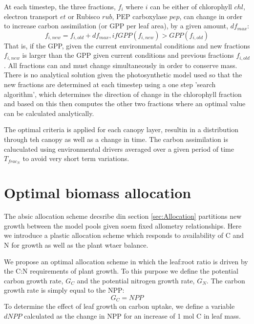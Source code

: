 At each timestep, the three fractions, $f_i$ where $i$ can be either of chlorophyll $chl$, electron transport $et$ or Rubisco $rub$, PEP carboxylase $pep$, can change in order to increase carbon assimilation (or GPP per leaf area), by a given amount, $df_{max}$:
\begin{equation}
 f_{i, new}=f_{i, old}+df_{max}, if GPP(f_{i, new})>GPP(f_{i, old})
\end{equation}
That is, if the GPP, given the current environmental conditions and new fractions $f_{i, new}$ is larger than the GPP given current conditions and previous fractions $f_{i, old}$. All fractions can and must change simultaneously in order to conserve mass. There is no analytical solution given the photosynthetic model used so that the new fractions are determined at each timestep using a one step 'search algorithm', which determines the direction of change in the chlorophyll fraction and based on this then computes the other two fractions where an optimal value can be calculated analytically.

The optimal criteria is applied for each canopy layer, resultin in a distribution through teh canopy as well as a change in time. The carbon assimilation is caluculated using environmental drivers averaged over a given period of time $T_{frac_N}$ to avoid very short term variations.

\section{Optimal biomass allocation}\label{sec:optimal_allocation}
The absic allocation scheme decsribe din section \ref{sec:Allocation} partitions new growth between the model pools given soem fixed allometry relationships. Here we introduce a plastic allocation scheme which responds to availability of C and N for growth as well as the plant wtaer balance.

We propose an optimal allocation scheme in which the leaf:root ratio is driven by the C:N requirements of plant growth. To this purpose we define the potential carbon growth rate, $G_C$ and the potential nitrogen growth rate, $G_N$. The carbon growth rate is simply equal to the NPP:
\begin{equation}
 G_{C}=NPP
\end{equation}
To determine the effect of leaf growth on carbon uptake, we define a variable $dNPP$ calculated as the change in NPP for an increase of 1 mol C in leaf mass.

